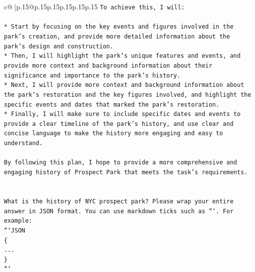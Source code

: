 \documentclass{article}
\begin{document}
{\begin{supertabular}{c@{$\;$}|p{.15\linewidth}@{}p{.15\linewidth}p{.15\linewidth}p{.15\linewidth}p{.15\linewidth}p{.15\linewidth}}
{{{\texttt{To achieve this, I will:} \\
\\ 
\texttt{* Start by focusing on the key events and figures involved in the park's creation, and provide more detailed information about the park's design and construction.} \\
\texttt{* Then, I will highlight the park's unique features and events, and provide more context and background information about their significance and importance to the park's history.} \\
\texttt{* Next, I will provide more context and background information about the park's restoration and the key figures involved, and highlight the specific events and dates that marked the park's restoration.} \\
\texttt{* Finally, I will make sure to include specific dates and events to provide a clear timeline of the park's history, and use clear and concise language to make the history more engaging and easy to understand.} \\
\\ 
\texttt{By following this plan, I hope to provide a more comprehensive and engaging history of Prospect Park that meets the task's requirements.} \\
\\ 
\\ 
\texttt{What is the history of NYC prospect park? Please wrap your entire answer in JSON format. You can use markdown ticks such as ```. For example:} \\
\texttt{```JSON} \\
\texttt{\{} \\
\texttt{...} \\
\texttt{\}} \\
\texttt{```} \\
            }
        }
    }
     \\ \\


\end{supertabular}}
\end{document}
